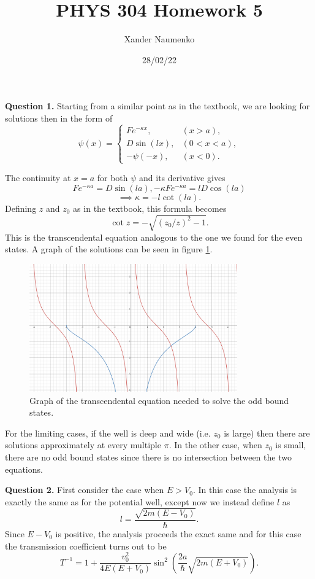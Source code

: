 \documentclass[letterpaper, reqno,11pt]{article}
\begin{document}
\title{PHYS 304 Homework 5}
\date{28/02/22}
\author{Xander Naumenko}
\maketitle

{\noindent\bf Question 1.} Starting from a similar point as in the textbook, we are looking for solutions then in the form of
\[
\psi(x)=\begin{cases}
    Fe^{-\kappa x},&(x>a),\\
    D\sin(lx),&(0<x<a),\\
    -\psi(-x),&(x<0).
\end{cases}
\]

The continuity at $x=a$ for both $\psi$ and its derivative gives
\[
Fe^{-\kappa a}=D\sin(la), -\kappa Fe^{-\kappa a}=lD\cos(la)
\]
\[
\implies \kappa=-l\cot(la)
.\]
Defining $z$ and $z_0$ as in the textbook, this formula becomes
\[
\cot z=-\sqrt{(z_0 /z)^2-1} 
.\]
This is the transcendental equation analogous to the one we found for the even states. A graph of the solutions can be seen in figure \ref{fig:q1}. 

\begin{figure}[htpb]
    \centering
    \includegraphics[width=0.8\textwidth]{q1}
    \caption{Graph of the transcendental equation needed to solve the odd bound states. }
    \label{fig:q1}
\end{figure}

For the limiting cases, if the well is deep and wide (i.e. $z_0$ is large) then there are solutions approximately at every multiple $\pi$. In the other case, when $z_0$ is small, there are no odd bound states since there is no intersection between the two equations.

{\noindent\bf Question 2.} First consider the case when $E>V_0$. In this case the analysis is exactly the same as for the potential well, except now we instead define $l$ as 
\[
l=\frac{\sqrt{2m(E-V_0)} }{\hbar}
.\]
Since $E-V_0$ is positive, the analysis proceeds the exact same and for this case the transmission coefficient turns out to be 
\[
T^{-1}=1+\frac{v_0^2}{4E(E+V_0)}\sin^2\left( \frac{2a}{\hbar}\sqrt{2m(E+V_0)}  \right) 
.\]
\end{document}
